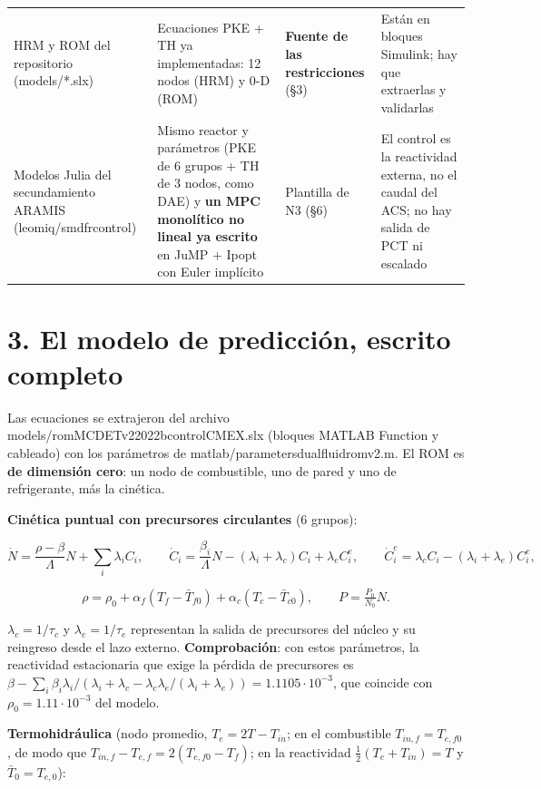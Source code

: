 \documentclass[11pt,a4paper]{article}
\newcommand{\codeus}{\textunderscore\allowbreak}
\newcommand{\code}[1]{{\small\ttfamily\let\_\codeus #1}}
\begin{document}
{\begin{xltabular}{\linewidth}{@{}YYYY@{}}
$$HRM y ROM del repositorio (\code{models/*.slx}) & Ecuaciones PKE + TH ya implementadas: 12 nodos (HRM) y 0-D (ROM) & \textbf{Fuente de las restricciones} (\S{}3) & Están en bloques Simulink; hay que extraerlas y validarlas \\
Modelos Julia del secundamiento ARAMIS (\code{leomiq/smdfr\_control}) & Mismo reactor y parámetros (PKE de 6 grupos + TH de 3 nodos, como DAE) y \textbf{un MPC monolítico no lineal ya escrito} en JuMP + Ipopt con Euler implícito & Plantilla de N3 (\S{}6) & El control es la reactividad externa, no el caudal del ACS; no hay salida de PCT ni escalado \\
\bottomrule
\end{xltabular}}

\medskip
\section*{3. El modelo de predicción, escrito completo}
Las ecuaciones se extrajeron del archivo \code{models/rom\_MCDET\_v2\_2022b\_control\_CMEX.slx} (bloques MATLAB Function y cableado) con los parámetros de \code{matlab/parameters\_dualfluid\_rom\_v2.m}. El ROM es \textbf{de dimensión cero}: un nodo de combustible, uno de pared y uno de refrigerante, más la cinética.

\textbf{Cinética puntual con precursores circulantes} (6 grupos):

\[
\dot N=\frac{\rho-\beta}{\Lambda}N+\sum_i\lambda_iC_i,\qquad
\dot C_i=\frac{\beta_i}{\Lambda}N-(\lambda_i+\lambda_c)C_i+\lambda_eC^e_i,\qquad
\dot C^e_i=\lambda_cC_i-(\lambda_i+\lambda_e)C^e_i,
\]

\[
\rho=\rho_0+\alpha_f(T_f-\bar T_{f0})+\alpha_c(T_c-\bar T_{c0}),\qquad P=\tfrac{P_0}{N_0}N .
\]

$\lambda_c=1/\tau_c$ y $\lambda_e=1/\tau_e$ representan la salida de precursores del núcleo y su reingreso desde el lazo externo. \textbf{Comprobación}: con estos parámetros, la reactividad estacionaria que exige la pérdida de precursores es $\beta-\sum_i\beta_i\lambda_i/(\lambda_i+\lambda_c-\lambda_c\lambda_e/(\lambda_i+\lambda_e)) =1.1105\cdot10^{-3}$, que coincide con $\rho_0=1.11\cdot10^{-3}$ del modelo.

\textbf{Termohidráulica} (nodo promedio, $T_e=2T-T_{in}$; en el combustible $T_{in,f}=T_{e,f0}$, de modo que $T_{in,f}-T_{e,f}=2(T_{e,f0}-T_f)$; en la reactividad $\tfrac12(T_e+T_{in})=T$ y $\bar T_0=T_{e,0}$):
\end{document}
